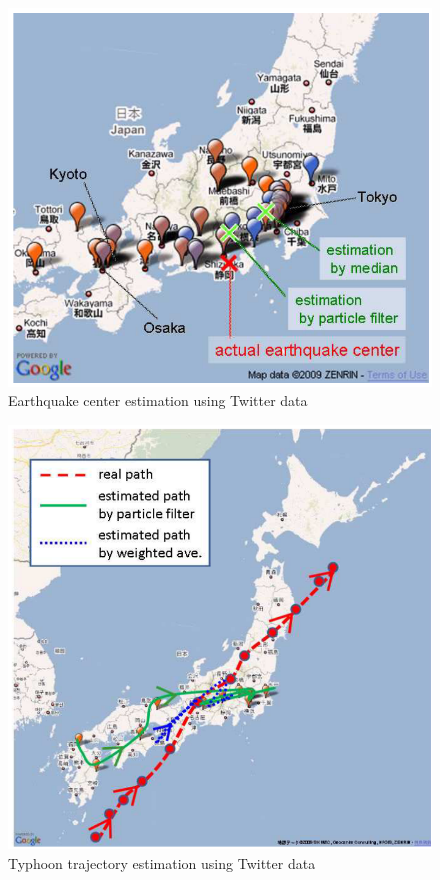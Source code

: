 \documentclass[10pt,a4paper]{article}
\begin{document}
\begin{figure}
	\centering
	\includegraphics[scale=0.60]{earthquake-center-estimation}
	\caption{Earthquake center estimation using Twitter data \cite{saka10a}}
	\label{fig:earthquake-center-estimation}
\end{figure}

\begin{figure}
	\centering
	\includegraphics[scale=0.60]{typhoon-trajectory-estimation}
	\caption{Typhoon trajectory estimation using Twitter data \cite{saka10a}}
	\label{fig:typhoon-trajectory-estimation}
\end{figure}
\end{document}
